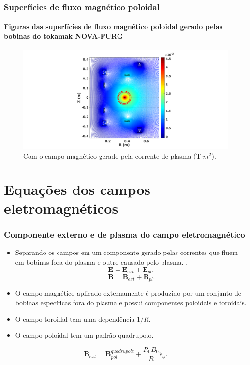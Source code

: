 \documentclass[aspectratio=169]{beamer}
\begin{document}
\begin{frame}		
\frametitle{ Superfícies de fluxo magnético poloidal }
\framesubtitle{Figuras das superfícies de fluxo magnético poloidal gerado pelas bobinas do tokamak NOVA-FURG}

	\begin{figure}[H]
\centering
\includegraphics[scale=0.3]{campo002-2.png} 
\caption{Com o campo magnético gerado pela corrente de plasma (T$\cdot m^2$).}
\label{fig: equipotenc2}
\end{figure}

\end{frame}
\section{Equações dos campos eletromagnéticos}

\begin{frame}		
\frametitle{Componente externo e de plasma do campo eletromagnético}
\begin{itemize}
\item Separando os campos em um componente gerado pelas correntes que fluem em bobinas fora do plasma e outro causado pelo plasma. \cite[cap. 2]{MagneticControl}.
$$\bm{E} = \bm{E}_{ext} + \bm{E}_{pl},$$   
$$\bm{B} = \bm{B}_{ext} + \bm{B}_{pl}.$$
\item O campo magnético aplicado externamente é produzido por um conjunto de bobinas específicas fora do plasma e possui componentes poloidais e toroidais. 
\item  O campo toroidal tem uma dependência $1 / R$.
\item O campo poloidal tem um padrão quadrupolo.
\end{itemize}
\begin{equation}
\label{Bext}
\bm{B}_{ext}=\bm{B}_{pol}^{quadrupole}+\frac{R_0B_0}{R}\hat{e}_{\phi} .
\end{equation}
\end{frame}
\end{document}
